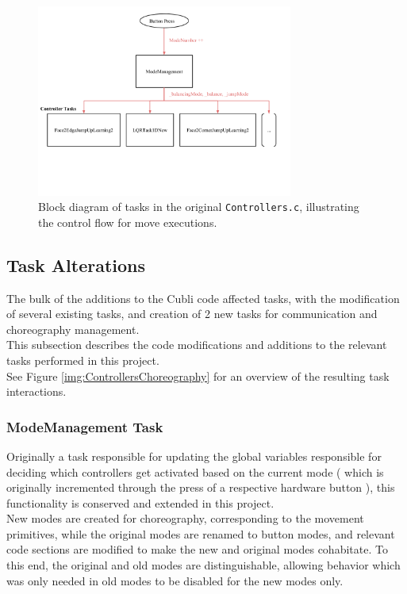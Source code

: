 \begin{figure}[ht]
   \centering
   \includegraphics[width=0.75\textwidth]{img/Controllers.png}
   \caption{Block diagram of tasks in the original \texttt{Controllers.c}, illustrating the control flow for move executions.}
   \label{img:Controllers}
\end{figure}


\subsection{Task Alterations}

The bulk of the additions to the Cubli code affected tasks, with the modification of several existing tasks, and creation of 2 new tasks for communication and choreography management.\\

This subsection describes the code modifications and additions to the relevant tasks performed in this project.\\

See Figure \ref{img:ControllersChoreography} for an overview of the resulting task interactions.

\subsubsection{ModeManagement Task}

Originally a task responsible for updating the global variables responsible for deciding which controllers get activated based on the current mode ( which is originally incremented through the press of a respective hardware button ), this functionality is conserved and extended in this project.\\

New modes are created for choreography, corresponding to the movement primitives, while the original modes are renamed to button modes, and relevant code sections are modified to make the new and original modes cohabitate. To this end, the original and old modes are distinguishable, allowing behavior which was only needed in old modes to be disabled for the new modes only.\\

